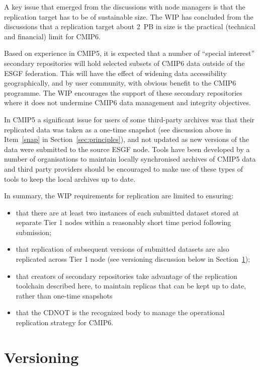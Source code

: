 \documentclass[gmd,manuscript]{copernicus}
\newcommand{\secref}[1] {\mbox{Section  \ref{sec:#1}}}
\begin{document}
A key issue that emerged from the discussions with node managers is
that the replication target has to be of sustainable size. The WIP has
concluded from the discussions that a replication target about 2~PB in
size is the practical (technical and financial) limit for CMIP6.

Based on experience in CMIP5, it is expected that a number of
``special interest'' secondary repositories will hold selected subsets
of CMIP6 data outside of the ESGF federation. This will have the
effect of widening data accessibility geographically, and by user
community, with obvious benefit to the CMIP6 programme. The WIP
encourages the support of these secondary repositories where it
does not undermine CMIP6 data management and integrity objectives.

In CMIP5 a significant issue for users of some third-party archives
was that their replicated data was taken as a one-time snapshot (see
discussion above in Item~\ref{snap} in \secref{principles}), and not
updated as new versions of the data were submitted to the source ESGF
node. Tools have been developed by a number of organisations to
maintain locally synchronised archives of CMIP5 data and third party
providers should be encouraged to make use of these types of tools to
keep the local archives up to date.

In summary, the WIP requirements for replication are limited to
ensuring:

\begin{itemize}
\item that there are at least two instances of each submitted dataset
  stored at separate Tier 1 nodes within a reasonably short time
  period following submission;
\item that replication of subsequent versions of submitted datasets
  are also replicated across Tier 1 node (see versioning discussion
  below in \secref{version});
\item that creators of secondary repositories take advantage of the
  replication toolchain described here, to maintain replicas that can
  be kept up to date, rather than one-time snapshots
\item that the CDNOT is the recognized body to manage the operational
  replication strategy for CMIP6.
\end{itemize}

\section{Versioning}
\label{sec:version}
\end{document}
